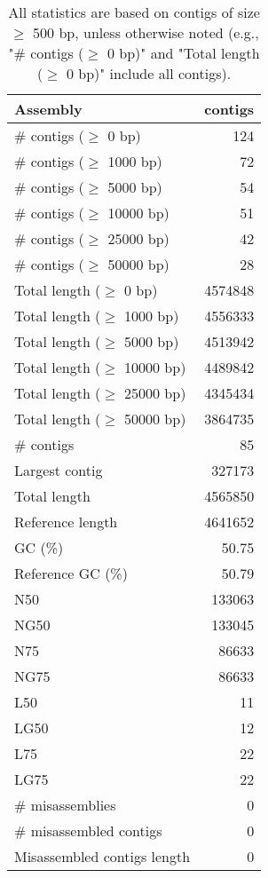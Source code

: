 \documentclass[12pt,a4paper]{article}
\begin{document}
\begin{table}[ht]
\begin{center}
\caption{All statistics are based on contigs of size $\geq$ 500 bp, unless otherwise noted (e.g., "\# contigs ($\geq$ 0 bp)" and "Total length ($\geq$ 0 bp)" include all contigs).}
\begin{tabular}{|l*{1}{|r}|}
\hline
Assembly & contigs \\ \hline
\# contigs ($\geq$ 0 bp) & 124 \\ \hline
\# contigs ($\geq$ 1000 bp) & 72 \\ \hline
\# contigs ($\geq$ 5000 bp) & 54 \\ \hline
\# contigs ($\geq$ 10000 bp) & 51 \\ \hline
\# contigs ($\geq$ 25000 bp) & 42 \\ \hline
\# contigs ($\geq$ 50000 bp) & 28 \\ \hline
Total length ($\geq$ 0 bp) & 4574848 \\ \hline
Total length ($\geq$ 1000 bp) & 4556333 \\ \hline
Total length ($\geq$ 5000 bp) & 4513942 \\ \hline
Total length ($\geq$ 10000 bp) & 4489842 \\ \hline
Total length ($\geq$ 25000 bp) & 4345434 \\ \hline
Total length ($\geq$ 50000 bp) & 3864735 \\ \hline
\# contigs & 85 \\ \hline
Largest contig & 327173 \\ \hline
Total length & 4565850 \\ \hline
Reference length & 4641652 \\ \hline
GC (\%) & 50.75 \\ \hline
Reference GC (\%) & 50.79 \\ \hline
N50 & 133063 \\ \hline
NG50 & 133045 \\ \hline
N75 & 86633 \\ \hline
NG75 & 86633 \\ \hline
L50 & 11 \\ \hline
LG50 & 12 \\ \hline
L75 & 22 \\ \hline
LG75 & 22 \\ \hline
\# misassemblies & 0 \\ \hline
\# misassembled contigs & 0 \\ \hline
Misassembled contigs length & 0 \\ \hline

\end{tabular}
\end{center}
\end{table}
\end{document}
